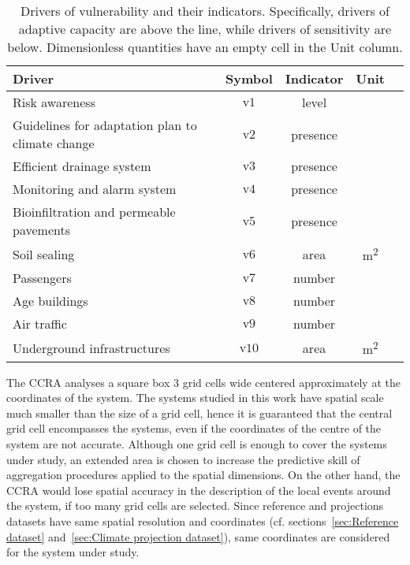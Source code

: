 \begin{table}[h]
  \renewcommand*{\arraystretch}{1.5}
  \centering
  \caption{Drivers of vulnerability and their indicators. Specifically, drivers of adaptive capacity are above the line, while drivers of sensitivity are below. Dimensionless quantities have an empty cell in the Unit column.}
  \label{tab:drivers_vulnerability}
  \begin{tabular}{p{}cccc}
    Driver                                           & Symbol         & Indicator & Unit                 \\
    \hline
    Risk awareness                                   & $\mathrm{v1}$  & level     &                      \\
    Guidelines for adaptation plan to climate change & $\mathrm{v2}$  & presence  &                      \\
    Efficient drainage system                        & $\mathrm{v3}$  & presence  &                      \\
    Monitoring and alarm system                      & $\mathrm{v4}$  & presence  &                      \\
    Bioinfiltration and permeable pavements          & $\mathrm{v5}$  & presence  &                      \\
    \hline
    Soil sealing                                     & $\mathrm{v6}$  & area      & \unit{\square\metre} \\
    Passengers                                       & $\mathrm{v7}$  & number    &                      \\
    Age buildings                                    & $\mathrm{v8}$  & number    &                      \\
    Air traffic                                      & $\mathrm{v9}$  & number    &                      \\
    Underground infrastructures                      & $\mathrm{v10}$ & area      & \unit{\square\metre} \\
    \end{tabular}
\end{table}

The \gls{CCRA} analyses a square box 3 grid cells wide centered approximately at the coordinates of the system. The systems studied in this work have spatial scale much smaller than the size of a grid cell, hence it is guaranteed that the central grid cell encompasses the systems, even if the coordinates of the centre of the system are not accurate.
Although one grid cell is enough to cover the systems under study, an extended area is chosen to increase the predictive skill of aggregation procedures applied to the spatial dimensions. On the other hand, the \gls{CCRA} would lose spatial accuracy in the description of the local events around the system, if too many grid cells are selected.
Since reference and projections datasets have same spatial resolution and coordinates (cf. sections~\ref{sec:Reference dataset} and~\ref{sec:Climate projection dataset}), same coordinates are considered for the system under study.

